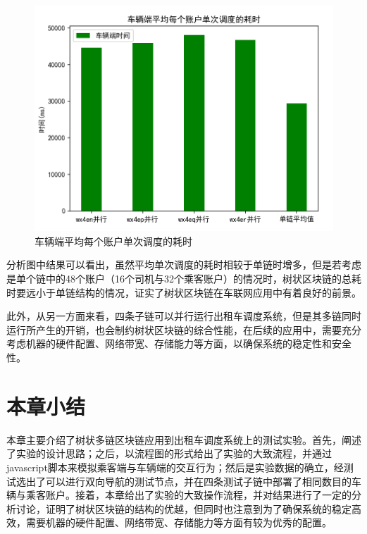 \begin{figure}
	\centering
	\includegraphics[width=\textwidth]{figures/车辆端平均每个账户单次调度的耗时.png}
	\caption{车辆端平均每个账户单次调度的耗时}
	\label{fig:车辆端平均每个账户单次调度的耗时}
\end{figure}

分析图中结果可以看出，虽然平均单次调度的耗时相较于单链时增多，但是若考虑是单个链中的48个账户（16个司机与32个乘客账户）的情况时，树状区块链的总耗时要远小于单链结构的情况，证实了树状区块链在车联网应用中有着良好的前景。

此外，从另一方面来看，四条子链可以并行运行出租车调度系统，但是其多链同时运行所产生的开销，也会制约树状区块链的综合性能，在后续的应用中，需要充分考虑机器的硬件配置、网络带宽、存储能力等方面，以确保系统的稳定性和安全性。

\section{本章小结}

本章主要介绍了树状多链区块链应用到出租车调度系统上的测试实验。首先，阐述了实验的设计思路；之后，以流程图的形式给出了实验的大致流程，并通过javascript脚本来模拟乘客端与车辆端的交互行为；然后是实验数据的确立，经测试选出了可以进行双向导航的测试节点，并在四条测试子链中部署了相同数目的车辆与乘客账户。接着，本章给出了实验的大致操作流程，并对结果进行了一定的分析讨论，证明了树状区块链的结构的优越，但同时也注意到为了确保系统的稳定高效，需要机器的硬件配置、网络带宽、存储能力等方面有较为优秀的配置。

